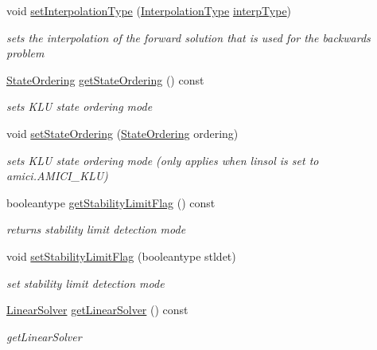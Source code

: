 \begin{DoxyCompactItemize}
void \mbox{\hyperlink{classamici_1_1_solver_a9d9a0a5f8cdfdb993960706c646e240f}{set\+Interpolation\+Type}} (\mbox{\hyperlink{namespaceamici_a8472f01c511d77bbfb981a46618ea1ea}{Interpolation\+Type}} \mbox{\hyperlink{classamici_1_1_solver_a5a80193af5ca74a4a4e3da67a7e74a98}{interp\+Type}})
\begin{DoxyCompactList}\small\item\em sets the interpolation of the forward solution that is used for the backwards problem \end{DoxyCompactList}\item 
\mbox{\hyperlink{namespaceamici_a890d968060d6d830aeed98dbeb04447f}{State\+Ordering}} \mbox{\hyperlink{classamici_1_1_solver_ac758cf7c51f50db18ea58898623ce12c}{get\+State\+Ordering}} () const
\begin{DoxyCompactList}\small\item\em sets K\+LU state ordering mode \end{DoxyCompactList}\item 
void \mbox{\hyperlink{classamici_1_1_solver_aa22ae4579c350a6f3fae2e3b5a0da1de}{set\+State\+Ordering}} (\mbox{\hyperlink{namespaceamici_a890d968060d6d830aeed98dbeb04447f}{State\+Ordering}} ordering)
\begin{DoxyCompactList}\small\item\em sets K\+LU state ordering mode (only applies when linsol is set to amici.\+A\+M\+I\+C\+I\+\_\+\+K\+LU) \end{DoxyCompactList}\item 
booleantype \mbox{\hyperlink{classamici_1_1_solver_ae1e9c3c5e59413ae25fb67c29983e3f3}{get\+Stability\+Limit\+Flag}} () const
\begin{DoxyCompactList}\small\item\em returns stability limit detection mode \end{DoxyCompactList}\item 
void \mbox{\hyperlink{classamici_1_1_solver_a618a94f1d84f9c71230d476f9a0205ce}{set\+Stability\+Limit\+Flag}} (booleantype stldet)
\begin{DoxyCompactList}\small\item\em set stability limit detection mode \end{DoxyCompactList}\item 
\mbox{\hyperlink{namespaceamici_a1a6a4776314a0843143e5631c3ce21a7}{Linear\+Solver}} \mbox{\hyperlink{classamici_1_1_solver_aa5cde2d316aae1d60d6eaf94ce7a854f}{get\+Linear\+Solver}} () const
\begin{DoxyCompactList}\small\item\em get\+Linear\+Solver \end{DoxyCompactList}\item 

\end{DoxyCompactItemize}
